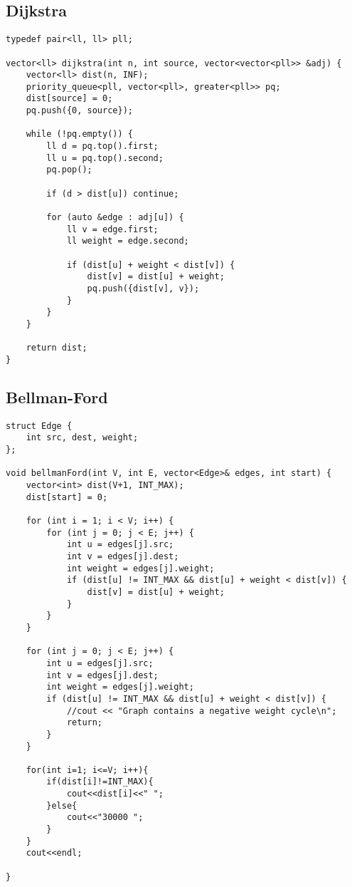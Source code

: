\documentclass{article}
\begin{document}
\subsection{Dijkstra}
\begin{lstlisting}
typedef pair<ll, ll> pll;
 
vector<ll> dijkstra(int n, int source, vector<vector<pll>> &adj) {
    vector<ll> dist(n, INF);
    priority_queue<pll, vector<pll>, greater<pll>> pq; 
    dist[source] = 0;
    pq.push({0, source}); 

    while (!pq.empty()) {
        ll d = pq.top().first; 
        ll u = pq.top().second; 
        pq.pop();

        if (d > dist[u]) continue;

        for (auto &edge : adj[u]) {
            ll v = edge.first;
            ll weight = edge.second; 

            if (dist[u] + weight < dist[v]) { 
                dist[v] = dist[u] + weight;
                pq.push({dist[v], v}); 
            }
        }
    }

    return dist;
}
\end{lstlisting}
\subsection{Bellman-Ford}
\begin{lstlisting}
struct Edge {
    int src, dest, weight;
};

void bellmanFord(int V, int E, vector<Edge>& edges, int start) {
    vector<int> dist(V+1, INT_MAX);
    dist[start] = 0;

    for (int i = 1; i < V; i++) {
        for (int j = 0; j < E; j++) {
            int u = edges[j].src;
            int v = edges[j].dest;
            int weight = edges[j].weight;
            if (dist[u] != INT_MAX && dist[u] + weight < dist[v]) {
                dist[v] = dist[u] + weight;
            }
        }
    }

    for (int j = 0; j < E; j++) {
        int u = edges[j].src;
        int v = edges[j].dest;
        int weight = edges[j].weight;
        if (dist[u] != INT_MAX && dist[u] + weight < dist[v]) {
            //cout << "Graph contains a negative weight cycle\n";
            return;
        }
    }

    for(int i=1; i<=V; i++){
        if(dist[i]!=INT_MAX){
            cout<<dist[i]<<" ";
        }else{
            cout<<"30000 ";
        }
    }
    cout<<endl;

}
\end{lstlisting}
\end{document}
